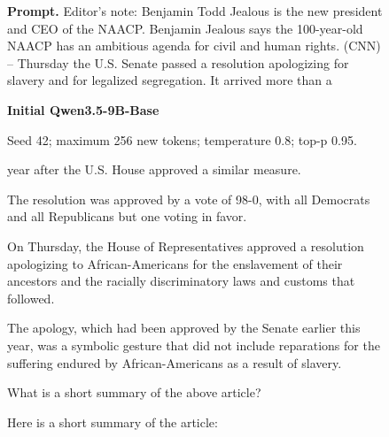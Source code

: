 \begin{figure}[p]\centering
\begin{minipage}{\linewidth}\footnotesize\textbf{Prompt.} Editor's note: Benjamin Todd Jealous is the new president and CEO of the NAACP. Benjamin Jealous says the 100-year-old NAACP has an ambitious agenda for civil and human rights. (CNN) -- Thursday the U.S. Senate passed a resolution apologizing for slavery and for legalized segregation. It arrived more than a
\end{minipage}\par\medskip
\begin{minipage}[t]{.48\linewidth}\raggedright\footnotesize
\textbf{Initial Qwen3.5-9B-Base}\par\smallskip
Seed 42; maximum 256 new tokens; temperature 0.8; top-p 0.95.\par\medskip
 year after the U.S. House approved a similar measure.

The resolution was approved by a vote of 98-0, with all Democrats and all Republicans but one voting in favor.

On Thursday, the House of Representatives approved a resolution apologizing to African-Americans for the enslavement of their ancestors and the racially discriminatory laws and customs that followed.

The apology, which had been approved by the Senate earlier this year, was a symbolic gesture that did not include reparations for the suffering endured by African-Americans as a result of slavery.

What is a short summary of the above article?

Here is a short summary of the article:


\end{minipage}
\end{figure}
